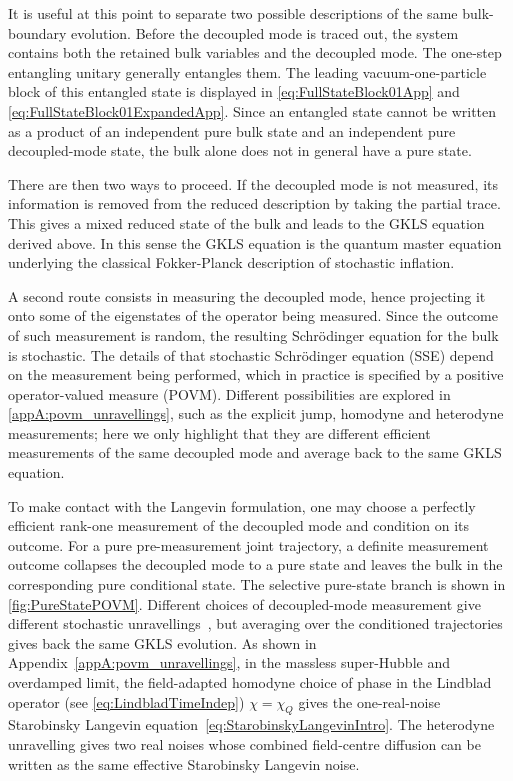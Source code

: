 \documentclass{article}
\numberwithin{equation}{section}
\begin{document}
	It is useful at this point to separate two possible descriptions of the same bulk-boundary evolution. Before the decoupled mode is traced out, the system contains both the retained bulk variables and the decoupled mode. The one-step entangling unitary generally entangles them. The leading vacuum-one-particle block of this entangled state is displayed in \cref{eq:FullStateBlock01App} and \eqref{eq:FullStateBlock01ExpandedApp}. Since an entangled state cannot be written as a product of an independent pure bulk state and an independent pure decoupled-mode state, the bulk alone does not in general have a pure state.

	There are then two ways to proceed. If the decoupled mode is not measured, its information is removed from the reduced description by taking the partial trace. This gives a mixed reduced state of the bulk and leads to the GKLS equation derived above. In this sense the GKLS equation is the quantum master equation underlying the classical Fokker-Planck description of stochastic inflation.

A second route consists in measuring the decoupled mode, hence projecting it onto some of the eigenstates of the operator being measured. Since the outcome of such measurement is random, the resulting Schr\"odinger equation for the bulk is stochastic. The details of that stochastic Schr\"odinger equation (SSE) depend on the measurement being performed, which in practice is specified by a positive operator-valued measure (POVM). Different possibilities are explored in \cref{appA:povm_unravellings}, such as the explicit jump, homodyne and heterodyne measurements; here we only highlight that they are different efficient measurements of the same decoupled mode and average back to the same GKLS equation.
     
     To make contact with the Langevin formulation, one may choose a perfectly efficient rank-one measurement of the decoupled mode and condition on its outcome. For a pure pre-measurement joint trajectory, a definite measurement outcome collapses the decoupled mode to a pure state and leaves the bulk in the corresponding pure conditional state. The selective pure-state branch is shown in \cref{fig:PureStatePOVM}. Different choices of decoupled-mode measurement give different stochastic unravellings~\cite{wiseman2009quantum}, but averaging over the conditioned trajectories gives back the same GKLS evolution. As shown in Appendix~\ref{appA:povm_unravellings}, in the massless super-Hubble and overdamped limit, the field-adapted homodyne choice of phase in the Lindblad operator (see \cref{eq:LindbladTimeIndep}) \(\chi=\chi_Q\) gives the one-real-noise Starobinsky Langevin equation~\eqref{eq:StarobinskyLangevinIntro}. The heterodyne unravelling gives two real noises whose combined field-centre diffusion can be written as the same effective Starobinsky Langevin noise.
\end{document}
